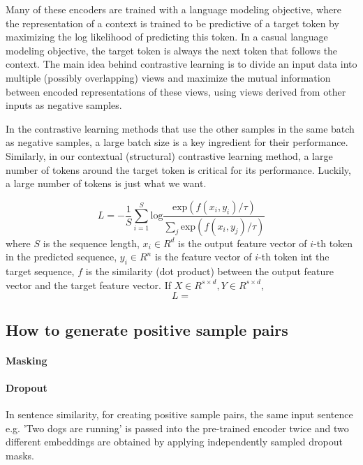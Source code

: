 \documentclass[a4paper]{article}
\begin{document}
	\cite{kong2019mutual}
	Many of these encoders are trained with a language modeling objective, where the representation of a context is trained to be predictive of a target token by maximizing the log likelihood of predicting this token.
	In a casual language modeling objective, the target token is always the next token that follows the context.
	The main idea behind contrastive learning is to divide an input data into multiple (possibly overlapping) views and maximize the mutual information between encoded representations of these views, using views derived from other inputs as negative samples.

	In the contrastive learning methods that use the other samples in the same batch as negative samples, a large batch size is a key ingredient for their performance.
	Similarly, in our contextual (structural) contrastive learning method, a large number of tokens around the target token is critical for its performance.
	Luckily, a large number of tokens is just what we want.

	\begin{equation}
		L = -\frac{1}{S} \sum_{i=1}^S \text{log} \frac{\text{exp}(f(x_i, y_i) / \tau)}{\sum_{j} \text{exp}(f(x_i, y_j) / \tau)}
	\end{equation}
	where $S$ is the sequence length, $x_i \in R^d$ is the output feature vector of $i$-th token in the predicted sequence, 
	$y_i \in R^n$ is the feature vector of $i$-th token int the target sequence,
	$f$ is the similarity (dot product) between the output feature vector and the target feature vector.
	If $X \in R^{s \times d}, Y \in R^{s \times d}$,
	\begin{equation}
		L = 
	\end{equation}

	\subsection{How to generate positive sample pairs}
	\paragraph*{Masking}
	\paragraph*{Dropout} \cite{gao2021simcse} In sentence similarity, for creating positive sample pairs, the same input sentence e.g. 'Two dogs are running' is passed into the pre-trained encoder twice and two different embeddings are obtained by applying independently sampled dropout masks.  
\end{document}
